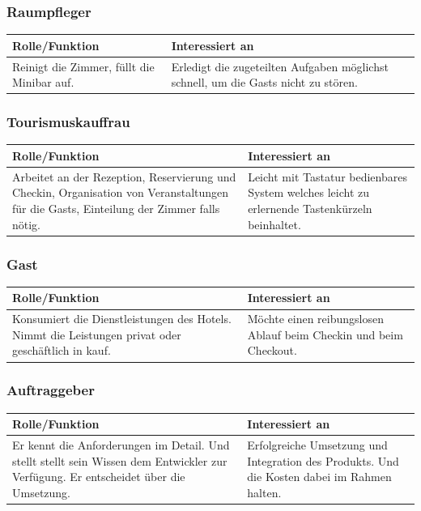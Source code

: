 \documentclass[10pt,a4paper,titlepage]{article}
\begin{document}
\subsubsection{Raumpfleger}
\begin{tabular}[t]{|p{5cm}|p{5cm}|}
    \hline
    \textbf{Rolle\slash{}Funktion} & \textbf{Interessiert an} \\
    \hline
Reinigt die \Gls{Zimmer}, füllt die Minibar auf. &
	Erledigt die zugeteilten Aufgaben möglichst schnell, um die \Glspl{Gast} nicht zu stören. \\
    \hline
\end{tabular}
\subsubsection{Tourismuskauffrau}
\begin{tabular}[t]{|p{5cm}|p{5cm}|}
    \hline
    \textbf{Rolle\slash{}Funktion} & \textbf{Interessiert an} \\
    \hline
Arbeitet an der \Gls{Rezeption}, \Gls{Reservierung} und \Gls{Checkin}, Organisation von Veranstaltungen für die \Glspl{Gast}, Einteilung der \Gls{Zimmer} falls nötig. &
	Leicht mit Tastatur bedienbares System welches leicht zu erlernende Tastenkürzeln beinhaltet. \\
    \hline
\end{tabular}
\subsubsection{\Gls{Gast}}
\begin{tabular}[t]{|p{5cm}|p{5cm}|}
    \hline
    \textbf{Rolle\slash{}Funktion} & \textbf{Interessiert an} \\
    \hline
	Konsumiert die Dienstleistungen des Hotels. Nimmt die Leistungen privat oder geschäftlich in kauf. &
	Möchte einen reibungslosen Ablauf beim \Gls{Checkin} und beim \Gls{Checkout}. \\
    \hline
\end{tabular}
\subsubsection{Auftraggeber}
\begin{tabular}[t]{|p{5cm}|p{5cm}|}
    \hline
    \textbf{Rolle\slash{}Funktion} & \textbf{Interessiert an} \\
    \hline
	Er kennt die Anforderungen im Detail. Und stellt stellt sein Wissen dem Entwickler zur Verfügung. Er entscheidet über die Umsetzung. &
	Erfolgreiche Umsetzung und Integration des Produkts. Und die Kosten dabei im Rahmen halten. \\
    \hline
\end{tabular}
\end{document}

